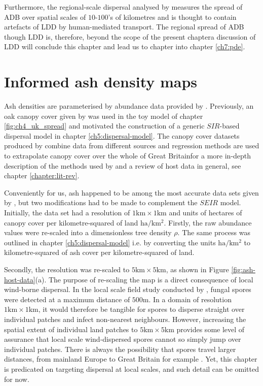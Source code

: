 Furthermore, the regional-scale dispersal analysed by \cite{grosdidier2018tracking} measures the spread of ADB over spatial scales of $10$-$100$'s of kilometres and is thought to contain artefacts of LDD by human-mediated transport. The regional spread of ADB though LDD is, therefore, beyond the scope of the present chapter\textemdash a discussion of LDD will conclude this chapter and lead us to chapter into chapter \ref{ch7:pde}.

\section{Informed ash density maps}

Ash densities are parameterised by abundance data provided by \cite{hill.data}. Previously, an oak canopy cover given by \cite{hill.data} was used in the toy model of chapter \ref{fig:ch4_uk_spread} and motivated the construction of a generic $SIR$-based dispersal model in chapter \ref{ch5:dispersal-model}. The canopy cover datasets produced by \cite{hill.data} combine data from different sources and regression methods are used to extrapolate canopy cover over the whole of Great Britain\textemdash for a more in-depth description of the methods used by \cite{hill.data} and a review of host data in general, see chapter \ref{chapter:lit-rev}.

Conveniently for us, ash happened to be among the most accurate data sets given by \cite{hill.data}, but two modifications had to be made to complement the $SEIR$ model. Initially, the data set had a resolution of $\mathrm{1km}\times \mathrm{1km}$ and units of hectares of canopy cover per kilometre-squared of land $\mathrm{ha/km^2}$. Firstly, the raw abundance values were re-scaled into a dimensionless tree density $\rho$. The same process was outlined in chapter \ref{ch5:dispersal-model} i.e. by converting the units $\mathrm{ha/km^2}$ to kilometre-squared of ash cover per kilometre-squared of land. 

Secondly, the resolution was re-scaled to $\mathrm{5km}\times \mathrm{5km}$, as shown in Figure \ref{fig:ash-host-data}(a). The purpose of re-scaling the map is a direct consequence of local wind-borne dispersal. In the local scale field study conducted by \cite{grosdidier2018tracking}, fungal spores were detected at a maximum distance of $500\mathrm{m}$. In a domain of resolution$\mathrm{1km}\times \mathrm{1km}$, it would therefore be tangible for spores to disperse straight over individual patches and infect non-nearest neighbours. However, increasing the spatial extent of individual land patches to $\mathrm{5km}\times \mathrm{5km}$ provides some level of assurance that local scale wind-dispersed spores cannot so simply jump over individual patches. There is always the possibility that spores travel larger distances, from mainland Europe to Great Britain for example \cite{freer2017tree, wylder2018evidence}. Yet, this chapter is predicated on targeting dispersal at local scales, and such detail can be omitted for now.

